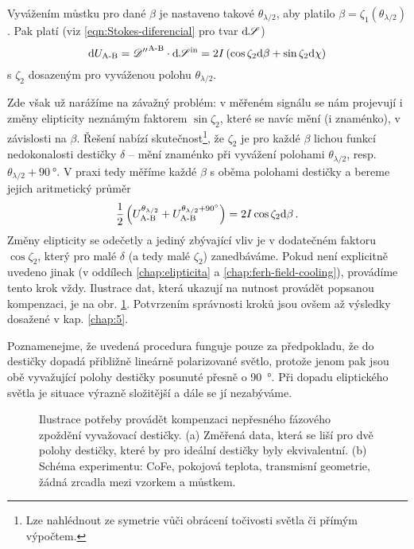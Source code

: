 Vyvážením můstku pro dané $\beta$ je nastaveno takové $\theta_{\lambda/2}$, aby platilo $\beta=\zeta_1(\theta_{\lambda/2})$.
Pak platí (viz \eqref{eqn:Stokes-diferencial} pro tvar $\textrm{d}\mathscr{S}$)
\begin{equation}
\label{eqn:mustek-s-elipticitou}
    \textrm{d}U_\textrm{A-B} = {\mathscr{D}''}^\textrm{A-B} \cdot \textrm{d}\mathscr{S}^\textrm{in} = 2I\left(\cos\zeta_2 \textrm{d}\beta + \sin\zeta_2\textrm{d}\chi\right) 
\end{equation}
s $\zeta_2$ dosazeným pro vyváženou polohu $\theta_{\lambda/2}$.

Zde však už narážíme na závažný problém: v měřeném signálu se nám projevují i změny elipticity neznámým faktorem $\sin\zeta_2$, které se navíc mění (i znaménko), v závislosti na $\beta$.
Řešení nabízí skutečnost\footnote{Lze nahlédnout ze symetrie vůči obrácení točivosti světla či přímým výpočtem.}, že $\zeta_2$ je pro každé $\beta$ lichou funkcí nedokonalosti destičky $\delta$ -- mění znaménko při vyvážení polohami $\theta_{\lambda/2}$, resp. $\theta_{\lambda/2}+\SI{90}{\degree}$.
V praxi tedy měříme každé $\beta$ s oběma polohami destičky a bereme jejich aritmetický průměr
\begin{equation}
\label{eqn:mustek-kompenzace-desticek-prumer}
    \frac{1}{2}\left(U_\textrm{A-B}^{\theta_{\lambda/2}}+U_\textrm{A-B}^{\theta_{\lambda/2}+\SI{90}{\degree}}\right) = 2I\cos\zeta_2 \textrm{d}\beta \,.
\end{equation}
Změny elipticity se odečetly a jediný zbývající vliv je v dodatečném faktoru $\cos\zeta_2$, který pro malé $\delta$ (a tedy malé $\zeta_2$) zanedbáváme.
Pokud není explicitně uvedeno jinak (v oddílech \ref{chap:elipticita} a \ref{chap:ferh-field-cooling}), provádíme tento krok vždy.
Ilustrace dat, která ukazují na nutnost provádět popsanou kompenzaci, je na obr. \ref{fig:mustek-desticka-ilustrace}.
Potvrzením správnosti kroků jsou ovšem až výsledky dosažené v kap. \ref{chap:5}.

Poznamenejme, že uvedená procedura funguje pouze za předpokladu, že do destičky dopadá přibližně lineárně polarizované světlo, protože jenom pak jsou obě vyvažující polohy destičky posunuté přesně o \SI{90}{\degree}.
Při dopadu eliptického světla je situace výrazně složitější a dále se jí nezabýváme.

\begin{figure}[htbp]
    \centering
    \caption{Ilustrace potřeby provádět kompenzaci nepřesného fázového zpoždění vyvažovací destičky. (a) Změřená data, která se liší pro dvě polohy destičky, které by pro ideální destičky byly ekvivalentní. (b) Schéma experimentu: CoFe, pokojová teplota, transmisní geometrie, žádná zrcadla mezi vzorkem a můstkem.}
    \label{fig:mustek-desticka-ilustrace}
\end{figure}

